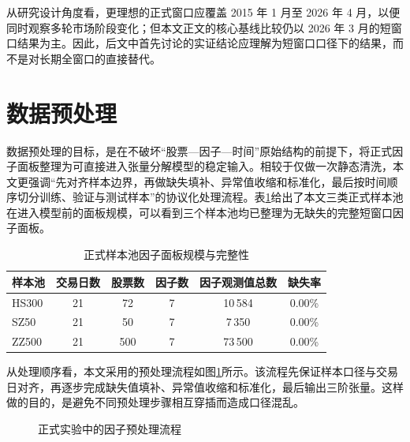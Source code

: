 从研究设计角度看，更理想的正式窗口应覆盖 2015 年 1 月至 2026 年 4 月，以便同时观察多轮市场阶段变化；但本文正文的核心基线比较仍以 2026 年 3 月的短窗口结果为主。因此，后文中首先讨论的实证结论应理解为短窗口口径下的结果，而不是对长期全窗口的直接替代。

\section{数据预处理}

数据预处理的目标，是在不破坏“股票—因子—时间”原始结构的前提下，将正式因子面板整理为可直接进入张量分解模型的稳定输入。相较于仅做一次静态清洗，本文更强调“先对齐样本边界，再做缺失填补、异常值收缩和标准化，最后按时间顺序切分训练、验证与测试样本”的协议化处理流程。表\ref{tab:preprocess-panel-summary}给出了本文三类正式样本池在进入模型前的面板规模，可以看到三个样本池均已整理为无缺失的完整短窗口因子面板。

\begin{table}[htbp]
\centering
\caption{正式样本池因子面板规模与完整性}
\label{tab:preprocess-panel-summary}
\small
\begin{tabular}{lccccc}
\toprule
样本池 & 交易日数 & 股票数 & 因子数 & 因子观测值总数 & 缺失率 \\
\midrule
HS300 & 21 & 72 & 7 & 10\,584 & 0.00\% \\
SZ50  & 21 & 50 & 7 & 7\,350  & 0.00\% \\
ZZ500 & 21 & 500 & 7 & 73\,500 & 0.00\% \\
\bottomrule
\end{tabular}
\end{table}

从处理顺序看，本文采用的预处理流程如图\ref{fig:preprocess-flow}所示。该流程先保证样本口径与交易日对齐，再逐步完成缺失值填补、异常值收缩和标准化，最后输出三阶张量。这样做的目的，是避免不同预处理步骤相互穿插而造成口径混乱。

\begin{figure}[htbp]
\centering
{}
\caption{正式实验中的因子预处理流程}
\label{fig:preprocess-flow}
\end{figure}

